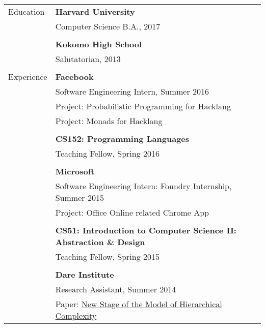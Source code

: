 \documentclass[letterpaper,11pt,oneside]{article}
\begin{document}
\noindent \begin{tabular}{@{} l l}
 \Large{Education}    & \textbf{Harvard University} \\
     & Computer Science B.A., 2017 \\
     & \\
     & \textbf{Kokomo High School} \\
     & Salutatorian, 2013 \\
     & \\
 \Large{Experience}    & \textbf{Facebook} \\
     & Software Engineering Intern, Summer 2016 \\
     & Project: Probabilistic Programming for Hacklang \\
     & Project: Monads for Hacklang \\
     & \\
     & \textbf{CS152: Programming Languages} \\
     & Teaching Fellow, Spring 2016 \\
     & \\ 
     & \textbf{Microsoft} \\
     & Software Engineering Intern: Foundry Internship, Summer 2015 \\
     & Project: Office Online related Chrome App \\
     & \\
     & \textbf{CS51: Introduction to Computer Science II: Abstraction \& Design}  \\
     & Teaching Fellow, Spring 2015 \\
     & \\
     & \textbf{Dare Institute} \\
     & Research Assistant, Summer 2014 \\
     & Paper: \href{http://psycnet.apa.org/journals/bdb/19/3/1.html}{New Stage of the Model of Hierarchical Complexity} \\

\end{tabular}
\end{document}

